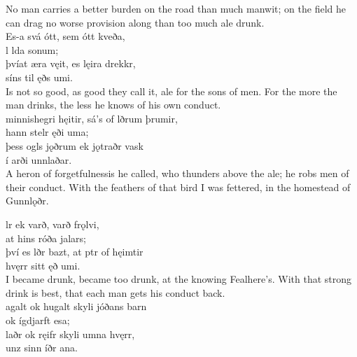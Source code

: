 \bvb No man carries a better burden on the road than much manwit; on the field he can drag no worse provision along than too much ale drunk. \\

\bva Es-a svá ótt, \hld sem ótt kveða, \\%
\ind {}l lda sonum; \\%
þvíat æra vęit, \hld es lęira drekkr, \\%
\ind síns til ęðs umi.\\%

\bvb Is not so good, as good they call it, ale for the sons of men. For the more the man drinks, the less he knows of his own conduct. \\

\bva {}minnishegri hęitir, \hld sá's of lðrum þrumir, \\%
\ind hann stelr ęði uma; \\%
þess ogls jǫðrum \hld ek jǫtraðr vask \\%
\ind í arði unnlaðar.\\%

\bvb A heron of forgetfulness\footnotemark[13] is he called, who thunders above the ale; he robs men of their conduct. With the feathers of that bird I was fettered, in the homestead of Gunnlǫðr. \\

\bva {}lr ek varð, \hld varð frǫlvi, \\%
\ind at hins róða jalars; \\%
því es lðr bazt, \hld at ptr of hęimtir \\%
\ind hvęrr sitt ęð umi.\\%

\bvb I became drunk, became too drunk, at the knowing Fealhere's. With that strong drink is best, that each man gets his conduct back. \\

\bva {}agalt ok hugalt \hld skyli jóðans barn \\%
\ind ok ígdjarft esa; \\%
laðr ok ręifr \hld skyli umna hvęrr, \\%
\ind unz sinn íðr ana.\\%

